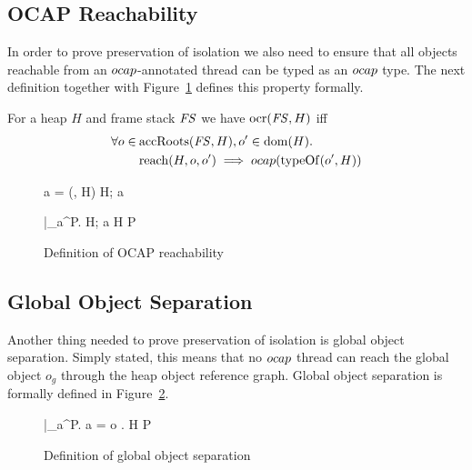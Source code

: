 \subsection{OCAP Reachability}%
\label{sub:ocap_reachability}

In order to prove preservation of isolation we also need to ensure that all
objects reachable from an $\mbox{$ocap$}$-annotated thread can be typed as an $\mbox{$ocap$}$
type. The next definition together with Figure~\ref{fig:def_ocapreach} defines
this property formally.
\begin{definition}
  For a heap $H$ and frame stack $\mathit{FS}$ we have $\mbox{$\mathrm{ocr}$}{(\ensuremath{\mathit{FS}},H)}$ iff
  \begin{align}
    \label{eq:ocr_def}
    \forall o \in \: &\mbox{$\mathrm{accRoots}$}(\mathit{FS},H), o' \in \mbox{$\mathrm{dom}$}(H). \notag\\
    &\mbox{$\mathrm{reach}$}{(H, o, o')} \implies \mbox{$ocap$}{(\mbox{$\mathrm{typeOf}$}{(o', H)})}
  \end{align}
\end{definition}

\begin{figure}
  { a = \ocap \implies \ocrloc(\FS, H) }
  { H; a \vdash \FS \tsep \ocr }

  \RuleSpace{}

  {\forall \FS|_a^\iota \in P. \: H; a \vdash \FS \tsep \ocr}
  {H \vdash P \tsep \ocr}

  \caption{Definition of OCAP reachability}
  \label{fig:def_ocapreach}
\end{figure}

\subsection{Global Object Separation}%
\label{sub:global_object_separation}

Another thing needed to prove preservation of isolation is global object
separation. Simply stated, this means that no $\mbox{$ocap$}$ thread can reach the global
object $o_g$ through the heap object reference graph. Global object separation
is formally defined in Figure~\ref{fig:def_gsep}.

\begin{figure}
  {\forall \FS|_a^\iota \in P. \: a = \ocap \implies \forall o \in {}. \:  }
  {H \vdash P \tsep \gsep}

  \caption{Definition of global object separation}
  \label{fig:def_gsep}
\end{figure}

